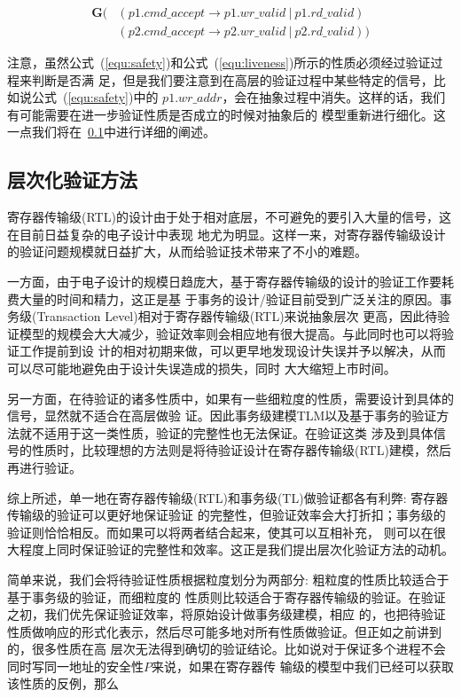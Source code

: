 \begin{equation} \label{equ:liveness}
\begin{split}
\mathbf{G}(
&(p1.cmd\_accept \rightarrow p1.wr\_valid\ |\ p1.rd\_valid)\\
&(p2.cmd\_accept \rightarrow p2.wr\_valid\ |\ p2.rd\_valid))
\end{split}
\end{equation}

注意，虽然公式~(\ref{equ:safety})和公式~(\ref{equ:liveness})所示的性质必须经过验证过程来判断是否满
足，但是我们要注意到在高层的验证过程中某些特定的信号，比如说公式~(\ref{equ:safety})中的
$p1.wr\_addr$，会在抽象过程中消失。这样的话，我们有可能需要在进一步验证性质是否成立的时候对抽象后的
模型重新进行细化。这一点我们将在~\ref{sec:hierarchy-method}中进行详细的阐述。


\subsection{层次化验证方法}
\label{sec:hierarchy-method}

寄存器传输级(RTL)的设计由于处于相对底层，不可避免的要引入大量的信号，这在目前日益复杂的电子设计中表现
地尤为明显。这样一来，对寄存器传输级设计的验证问题规模就日益扩大，从而给验证技术带来了不小的难题。

一方面，由于电子设计的规模日趋庞大，基于寄存器传输级的设计的验证工作要耗费大量的时间和精力，这正是基
于事务的设计/验证目前受到广泛关注的原因。事务级(Transaction Level)相对于寄存器传输级(RTL)来说抽象层次
更高，因此待验证模型的规模会大大减少，验证效率则会相应地有很大提高。与此同时也可以将验证工作提前到设
计的相对初期来做，可以更早地发现设计失误并予以解决，从而可以尽可能地避免由于设计失误造成的损失，同时
大大缩短上市时间。

另一方面，在待验证的诸多性质中，如果有一些细粒度的性质，需要设计到具体的信号，显然就不适合在高层做验
证。因此事务级建模TLM以及基于事务的验证方法就不适用于这一类性质，验证的完整性也无法保证。在验证这类
涉及到具体信号的性质时，比较理想的方法则是将待验证设计在寄存器传输级(RTL)建模，然后再进行验证。

综上所述，单一地在寄存器传输级(RTL)和事务级(TL)做验证都各有利弊: 寄存器传输级的验证可以更好地保证验证
的完整性，但验证效率会大打折扣；事务级的验证则恰恰相反。而如果可以将两者结合起来，使其可以互相补充，
则可以在很大程度上同时保证验证的完整性和效率。这正是我们提出层次化验证方法的动机。

简单来说，我们会将待验证性质根据粒度划分为两部分: 粗粒度的性质比较适合于基于事务级的验证，而细粒度的
性质则比较适合于寄存器传输级的验证。在验证之初，我们优先保证验证效率，将原始设计做事务级建模，相应
的，也把待验证性质做响应的形式化表示，然后尽可能多地对所有性质做验证。但正如之前讲到的，很多性质在高
层次无法得到确切的验证结论。比如说对于保证多个进程不会同时写同一地址的安全性$P$来说，如果在寄存器传
输级的模型中我们已经可以获取该性质的反例，那么

